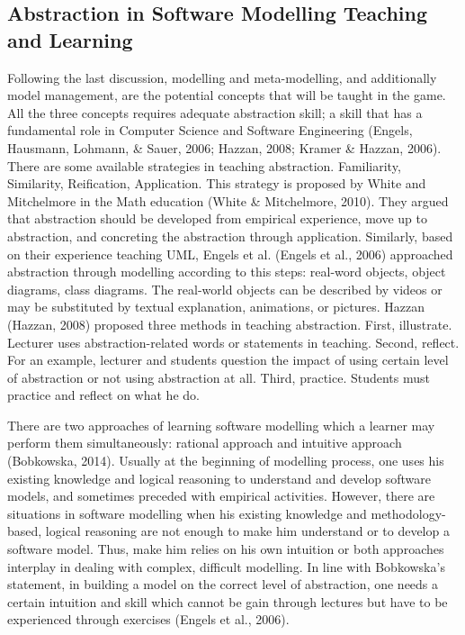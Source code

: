 \documentclass[a4paper]{Report}
\begin{document}
\subsection{Abstraction in Software Modelling Teaching and Learning}
Following the last discussion, modelling and meta-modelling, and additionally model management, are the potential concepts that will be taught in the game. All the three concepts requires adequate abstraction skill; a skill that has a fundamental role in Computer Science and Software Engineering (Engels, Hausmann, Lohmann, \& Sauer, 2006; Hazzan, 2008; Kramer \& Hazzan, 2006). 
There are some available strategies in teaching abstraction. Familiarity, Similarity, Reification, Application. This strategy is proposed by White and Mitchelmore in the Math education (White \& Mitchelmore, 2010). They argued that abstraction should be developed from empirical experience, move up to abstraction, and concreting the abstraction through application. Similarly, based on their experience teaching UML, Engels et al. (Engels et al., 2006) approached abstraction through modelling according to this steps: real-word objects, object diagrams, class diagrams. The real-world objects can be described by videos or may be substituted by textual explanation, animations, or pictures. Hazzan (Hazzan, 2008) proposed three methods in teaching abstraction. First, illustrate. Lecturer uses abstraction-related words or statements in teaching. Second, reflect. For an example, lecturer and students question the impact of using certain level of abstraction or not using abstraction at all. Third, practice. Students must practice and reflect on what he do.

There are two approaches of learning software modelling which a learner may perform them simultaneously: rational approach and intuitive approach (Bobkowska, 2014). Usually at the beginning of modelling process, one uses his existing knowledge and logical reasoning to understand and develop software models, and sometimes preceded with empirical activities. However, there are situations in software modelling when his existing knowledge and methodology-based, logical reasoning are not enough to make him understand or to develop a software model. Thus, make him relies on his own intuition or both approaches interplay in dealing with complex, difficult modelling. In line with Bobkowska's statement, in building a model on the correct level of abstraction, one needs a certain intuition and skill which cannot be gain through lectures but have to be experienced through exercises (Engels et al., 2006).
\end{document}
